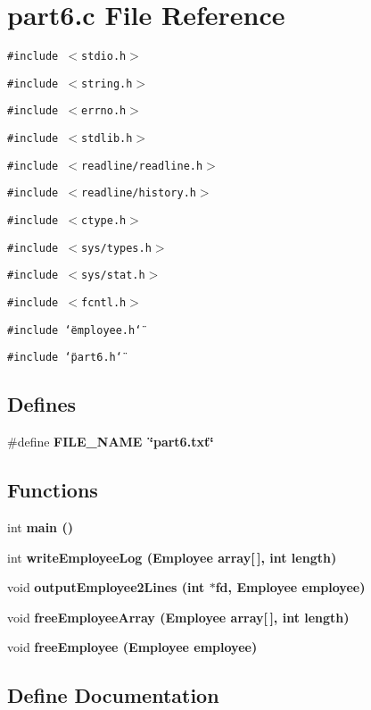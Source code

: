 \section{part6.c File Reference}
\label{part6_8c}
{\tt \#include $<$stdio.h$>$}\par
{\tt \#include $<$string.h$>$}\par
{\tt \#include $<$errno.h$>$}\par
{\tt \#include $<$stdlib.h$>$}\par
{\tt \#include $<$readline/readline.h$>$}\par
{\tt \#include $<$readline/history.h$>$}\par
{\tt \#include $<$ctype.h$>$}\par
{\tt \#include $<$sys/types.h$>$}\par
{\tt \#include $<$sys/stat.h$>$}\par
{\tt \#include $<$fcntl.h$>$}\par
{\tt \#include \char`\"{}employee.h\char`\"{}}\par
{\tt \#include \char`\"{}part6.h\char`\"{}}\par
\subsection*{Defines}
\begin{CompactItemize}
\item 
\#define \bf{FILE\_\-NAME}~\char`\"{}part6.txt\char`\"{}
\end{CompactItemize}
\subsection*{Functions}
\begin{CompactItemize}
\item 
int \bf{main} ()
\item 
int \bf{write\-Employee\-Log} (\bf{Employee} array[$\,$], int length)
\item 
void \bf{output\-Employee2Lines} (int $\ast$fd, \bf{Employee} employee)
\item 
void \bf{free\-Employee\-Array} (\bf{Employee} array[$\,$], int length)
\item 
void \bf{free\-Employee} (\bf{Employee} employee)
\end{CompactItemize}


\subsection{Define Documentation}
